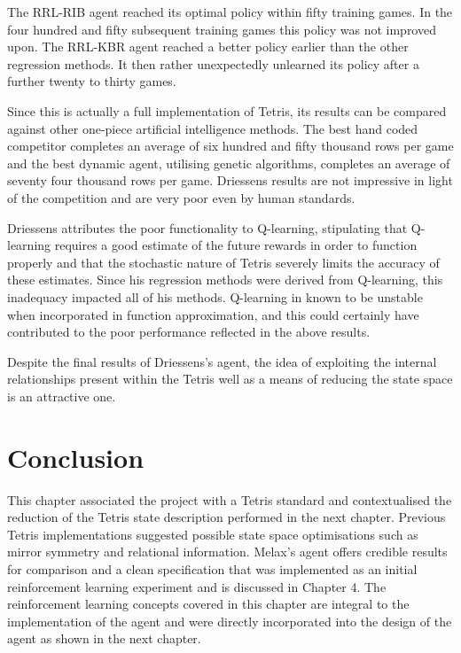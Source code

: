 \documentclass{rucsthesis}
\begin{document}
The RRL-RIB agent reached its optimal policy within fifty training games. In the four hundred and fifty subsequent training games this policy was not improved upon. The RRL-KBR agent reached a better policy earlier than the other regression methods. It then rather unexpectedly unlearned its policy after a further twenty to thirty games.

Since this is actually a full implementation of Tetris, its results can be compared against other one-piece artificial intelligence methods. The best hand coded competitor completes an average of six hundred and fifty thousand rows per game and the best dynamic agent, utilising genetic algorithms, completes an average of seventy four thousand rows per game\citep{tetstand}. Driessens results are not impressive in light of the competition and are very poor even by human standards.

Driessens attributes the poor functionality to Q-learning, stipulating that Q-learning requires a good estimate of the future rewards in order to function properly and that the stochastic nature of Tetris severely limits the accuracy of these estimates. Since his regression methods were derived from Q-learning, this inadequacy impacted all of his methods. Q-learning in known to be unstable \citep{keepaway,thrun93issues} when incorporated in function approximation, and this could certainly have contributed to the poor performance reflected in the above results.

Despite the final results of Driessens's agent, the idea of exploiting the internal relationships present within the Tetris well as a means of reducing the state space is an attractive one. 

\section{Conclusion}

This chapter associated the project with a Tetris standard and contextualised the reduction of the Tetris state description performed in the next chapter. Previous Tetris implementations suggested possible state space optimisations such as mirror symmetry and relational information. Melax's agent offers credible results for comparison and a clean specification that was implemented as an initial reinforcement learning experiment and is discussed in Chapter 4. The reinforcement learning concepts covered in this chapter are integral to the implementation of the agent and were directly incorporated into the design of the agent as shown in the next chapter.
\end{document}
